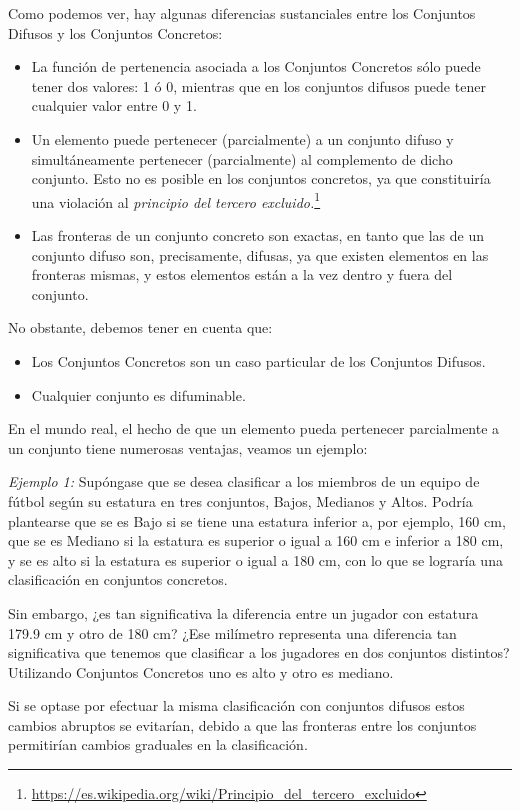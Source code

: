 Como podemos ver, hay algunas diferencias sustanciales entre los Conjuntos Difusos y los Conjuntos Concretos:
\begin{itemize}
	\item La función de pertenencia asociada a los Conjuntos Concretos sólo puede
	tener dos valores: 1 ó 0, mientras que en los conjuntos difusos puede
	tener cualquier valor entre 0 y 1.
	\item Un elemento puede pertenecer (parcialmente) a un conjunto difuso y
	simultáneamente pertenecer (parcialmente) al complemento de dicho
	conjunto. Esto no es posible en los conjuntos concretos, ya que
	constituiría una violación al \textit{principio del tercero excluido.}\footnote{\url{https://es.wikipedia.org/wiki/Principio_del_tercero_excluido}}
	\item Las fronteras de un conjunto concreto son exactas, en tanto que las de
	un conjunto difuso son, precisamente, difusas, ya que existen elementos
	en las fronteras mismas, y estos elementos están a la vez dentro y fuera
	del conjunto.
\end{itemize}

No obstante, debemos tener en cuenta que:
\begin{itemize}
	\item Los Conjuntos Concretos son un caso particular de los Conjuntos Difusos.
	\item Cualquier conjunto es difuminable.
\end{itemize}

En el mundo real, el hecho de que un elemento pueda pertenecer parcialmente a un conjunto tiene numerosas ventajas, veamos un ejemplo:

\textit{Ejemplo 1:} Supóngase que se desea clasificar a los miembros de un equipo
de fútbol según su estatura en tres conjuntos, Bajos, Medianos y Altos.
Podría plantearse que se es Bajo si se tiene una estatura inferior a, por
ejemplo, 160 cm, que se es Mediano si la estatura es superior o igual a 160
cm e inferior a 180 cm, y se es alto si la estatura es superior o igual a 180
cm, con lo que se lograría una clasificación en conjuntos concretos. \label{ej:1}

Sin embargo, ¿es tan significativa la diferencia entre un jugador con estatura 179.9 cm y otro de 180 cm? ¿Ese milímetro representa una diferencia tan significativa que tenemos que clasificar a los jugadores en dos conjuntos distintos? Utilizando Conjuntos Concretos uno es alto y otro es mediano.

Si se optase por efectuar la misma
clasificación con conjuntos difusos estos cambios abruptos se evitarían,
debido a que las fronteras entre los conjuntos permitirían cambios graduales
en la clasificación.

